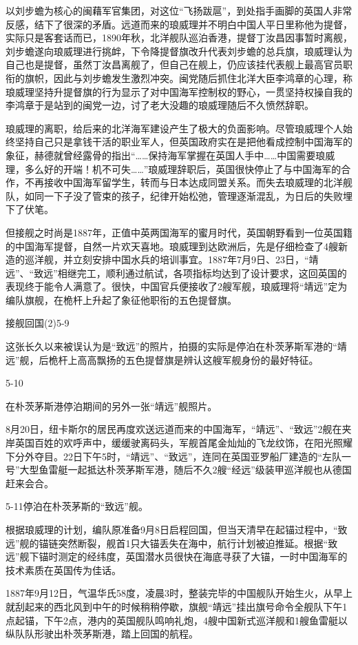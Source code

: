 \documentclass[12pt,UTF8]{ctexbook}
\begin{document}
以刘步蟾为核心的闽藉军官集团，对这位“飞扬跋扈”，到处指手画脚的英国人非常反感，结下了很深的矛盾。远道而来的琅威理并不明白中国人平日里称他为提督，实际只是客套话而已，1890年秋，北洋舰队巡泊香港，提督丁汝昌因事暂时离舰，刘步蟾遂向琅威理进行挑衅，下令降提督旗改升代表刘步蟾的总兵旗，琅威理认为自己也是提督，虽然丁汝昌离舰了，但自己在舰上，仍应该挂代表舰上最高官员职衔的旗帜，因此与刘步蟾发生激烈冲突。闽党随后抓住北洋大臣李鸿章的心理，称琅威理坚持升提督旗的行为显示了对中国海军控制权的野心，一贯坚持权操自我的李鸿章于是站到的闽党一边，讨了老大没趣的琅威理随后不久愤然辞职。

琅威理的离职，给后来的北洋海军建设产生了极大的负面影响。尽管琅威理个人始终坚持自己只是拿钱干活的职业军人，但英国政府实在是把他看成控制中国海军的象征，赫德就曾经露骨的指出“……保持海军掌握在英国人手中……中国需要琅威理，多么好的开端！机不可失……”琅威理辞职后，英国很快停止了与中国海军的合作，不再接收中国海军留学生，转而与日本达成同盟关系。而失去琅威理的北洋舰队，如同一下子没了管束的孩子，纪律开始松弛，管理逐渐混乱，为日后的失败埋下了伏笔。

但接舰之时尚是1887年，正值中英两国海军的蜜月时代，英国朝野看到一位英国籍的中国海军提督，自然一片欢天喜地。琅威理到达欧洲后，先是仔细检查了4艘新造的巡洋舰，并立刻安排中国水兵的培训事宜。1887年7月9日、23日，“靖远”、“致远”相继完工，顺利通过航试，各项指标均达到了设计要求，这回英国的表现终于能令人满意了。很快，中国官兵便接收了2艘军舰，琅威理将“靖远”定为编队旗舰，在桅杆上升起了象征他职衔的五色提督旗。

接舰回国(2)5-9

这张长久以来被误认为是“致远”的照片，拍摄的实际是停泊在朴茨茅斯军港的“靖远”舰，后桅杆上高高飘扬的五色提督旗是辨认这艘军舰身份的最好特征。

5-10

在朴茨茅斯港停泊期间的另外一张“靖远”舰照片。

8月20日，纽卡斯尔的居民再度欢送远道而来的中国海军，“靖远”、“致远”2舰在夹岸英国百姓的欢呼声中，缓缓驶离码头，军舰首尾金灿灿的飞龙纹饰，在阳光照耀下分外夺目。22日下午5时，“靖远”、“致远”，连同在英国亚罗船厂建造的“左队一号”大型鱼雷艇一起抵达朴茨茅斯军港，随后不久2艘“经远”级装甲巡洋舰也从德国赶来会合。

5-11停泊在朴茨茅斯的“致远”舰。

根据琅威理的计划，编队原准备9月8日启程回国，但当天清早在起锚过程中，“致远”舰的锚链突然断裂，舰首1只大锚丢失在海中，航行计划被迫推延。根据“致远”舰下锚时测定的经纬度，英国潜水员很快在海底寻获了大锚，一时中国海军的技术素质在英国传为佳话。

1887年9月12日，气温华氏58度，凌晨3时，整装完毕的中国舰队开始生火，从早上就刮起来的西北风到中午的时候稍稍停歇，旗舰“靖远”挂出旗号命令全舰队下午1点起锚，下午2点，港内的英国舰队鸣响礼炮，4艘中国新式巡洋舰和1艘鱼雷艇以纵队队形驶出朴茨茅斯港，踏上回国的航程。
\end{document}

